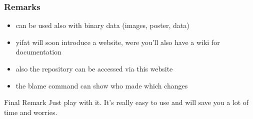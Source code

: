 \documentclass{beamer}
\begin{document}
\begin{frame}
	\frametitle{Remarks}

	\begin{itemize}
		\item<1-> can be used also with binary data (images, poster, data)
		\item<2-> yifat will soon introduce a website, were you'll also have a wiki for documentation
		\item<3-> also the repository can be accessed via this website
		\item<4-> the blame command can show who made which changes
	\end{itemize}
	
	\begin{block}{Final Remark}
		Just play with it. It's really easy to use and will save you a lot of time
		and worries.
	\end{block}
	
\end{frame}
\end{document}
